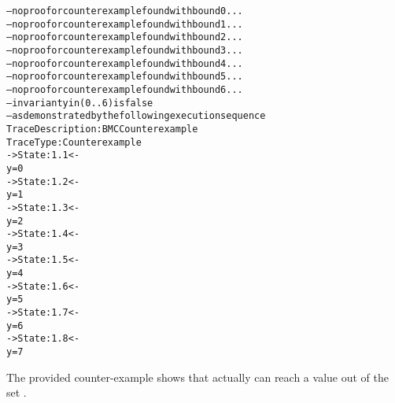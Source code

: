 \begin{alltt}
\nusmvprompt {}
-- no proof or counterexample found with bound 0 ...
-- no proof or counterexample found with bound 1 ...
-- no proof or counterexample found with bound 2 ...
-- no proof or counterexample found with bound 3 ...
-- no proof or counterexample found with bound 4 ...
-- no proof or counterexample found with bound 5 ...
-- no proof or counterexample found with bound 6 ...
-- invariant y in (0 .. 6)   is false
-- as demonstrated by the following execution sequence
Trace Description: BMC Counterexample
Trace Type: Counterexample
-> State: 1.1 <-
  y = 0
-> State: 1.2 <-
  y = 1
-> State: 1.3 <-
  y = 2
-> State: 1.4 <-
  y = 3
-> State: 1.5 <-
  y = 4
-> State: 1.6 <-
  y = 5
-> State: 1.7 <-
  y = 6
-> State: 1.8 <-
  y = 7
\nusmvprompt
\end{alltt}

The provided counter-example shows that  actually can reach a
value out of the set . 	

